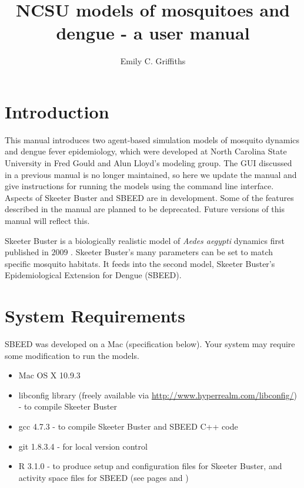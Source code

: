 \documentclass[11pt]{article}
\title{NCSU models of mosquitoes and dengue - a user manual}
\author{Emily C. Griffiths}
\begin{document}
\maketitle

\tableofcontents


\section{Introduction}
This manual introduces two agent-based simulation models of mosquito dynamics and dengue fever epidemiology, which were developed at North Carolina State University in Fred Gould and Alun Lloyd's modeling group. The GUI discussed in a previous manual is no longer maintained, so here we update the manual and give instructions for running the models using the command line interface. Aspects of Skeeter Buster and SBEED are in development. Some of the features described in the manual are planned to be deprecated. Future versions of this manual will reflect this.

Skeeter Buster is a biologically realistic model of \emph{Aedes aegypti} dynamics first published in $2009$ \cite{magori2009skeeter}. Skeeter Buster's many parameters can be set to match specific mosquito habitats. It feeds into the second model, Skeeter Buster's Epidemiological Extension for Dengue (SBEED). 

\section{System Requirements}

SBEED was developed on a Mac (specification below). Your system may require some modification to run the models.

\begin{center}
	\begin{itemize}
		\item Mac OS X 10.9.3
		\item libconfig library (freely available via \url{http://www.hyperrealm.com/libconfig/}) - to compile Skeeter Buster 
		\item gcc 4.7.3 - to compile Skeeter Buster and SBEED C++ code
		\item git 1.8.3.4 - for local version control
		\item R 3.1.0 - to produce setup and configuration files for Skeeter Buster, and activity space files for SBEED (see pages \pageref{Rsetup} and \pageref{ActivitySpace})
	\end{itemize}
\end{center}
\end{document}

